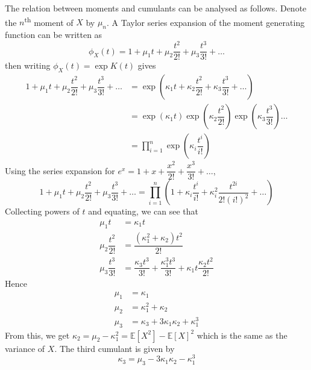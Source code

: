 \documentclass[11pt]{report} %
\begin{document}
The relation between moments and cumulants can be analysed as follows. Denote the $n$\textsuperscript{th} moment of $X$ by $\mu_{n}$. A Taylor series expansion of the moment generating function can be written as
\begin{equation}
\phi_{X}\left(t\right) = 1 + \mu_{1}t + \mu_{2}\dfrac{t^{2}}{2!} + \mu_{3}\dfrac{t^{3}}{3!} + \dots
\end{equation}
then writing $\phi_{X}\left(t\right) = \exp K\left(t\right) $ gives
\begin{align}
1 + \mu_{1}t + \mu_{2}\dfrac{t^{2}}{2!} + \mu_{3}\dfrac{t^{3}}{3!} + \dots &= \exp\left(\kappa_{1}t + \kappa_{2}\dfrac{t^{2}}{2!} + \kappa_{3}\dfrac{t^{3}}{3!} + \dots\right) \\
&= \exp\left(\kappa_{1}t\right)\exp\left(\kappa_{2}\dfrac{t^{2}}{2!}\right)\exp\left(\kappa_{3}\dfrac{t^{3}}{3!}\right)\dots \\
&= \prod_{i = 1}^{n}\exp\left(\kappa_{i}\dfrac{t^{i}}{i!}\right)
\end{align}
Using the series expansion for $e^{x} = 1 + x + \dfrac{x^{2}}{2!} + \dfrac{x^{3}}{3!} + \dots$,
\begin{equation}
1 + \mu_{1}t + \mu_{2}\dfrac{t^{2}}{2!} + \mu_{3}\dfrac{t^{3}}{3!} + \dots = \prod_{i = 1}^{n}\left(1 + \kappa_{i}\dfrac{t^{i}}{i!} + \kappa_{i}^{2}\dfrac{t^{2i}}{2!\left(i!\right)^{2}} + \dots\right)
\end{equation}
Collecting powers of $t$ and equating, we can see that
\begin{align}
\mu_{1}t &= \kappa_{1}t \\
\mu_{2}\dfrac{t^{2}}{2!} &= \dfrac{\left(\kappa_{1}^{2} + \kappa_{2}\right)t^{2}}{2!} \\
\mu_{3}\dfrac{t^{3}}{3!} &= \dfrac{\kappa_{3}t^{3}}{3!} + \dfrac{\kappa_{1}^{3}t^{3}}{3!} + \kappa_{1}t\dfrac{\kappa_{2}t^{2}}{2!}
\end{align}
Hence
\begin{align}
\mu_{1} &= \kappa_{1} \\
\mu_{2} &= \kappa_{1}^{2} + \kappa_{2} \\
\mu_{3} &= \kappa_{3} + 3\kappa_{1}\kappa_{2} + \kappa_{1}^{3}
\end{align}
From this, we get $\kappa_{2} = \mu_{2} - \kappa_{1}^{2} = \mathbb{E}\left[X^{2}\right] - \mathbb{E}\left[X\right]^{2}$ which is the same as the variance of $X$. The third cumulant is given by
\begin{equation}
\kappa_{3} = \mu_{3} - 3\kappa_{1}\kappa_{2} - \kappa_{1}^{3}
\end{equation}
\end{document}
